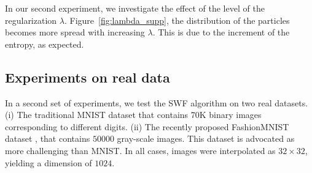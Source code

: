 


In our second experiment, we investigate the effect of the level of the regularization $\lambda$. Figure~\ref{fig:lambda_supp}, the distribution of the particles becomes more spread with increasing $\lambda$. This is due to the increment of the entropy, as expected.


%

\subsection{Experiments on real data}

In a second set of experiments, we test the SWF algorithm on two real datasets. (i) The traditional MNIST dataset that contains 70K binary images corresponding to different digits. (ii) The recently proposed FashionMNIST dataset \cite{xiao2017fashion}, that contains $50000$ gray-scale images. This dataset is advocated as more challenging than MNIST. In all cases, images were interpolated as $32\times 32$, yielding a dimension of $1024$.

